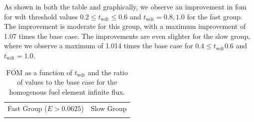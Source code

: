 As shown in both the table and graphically, we observe an improvement
in \gls{fom} for \gls{wdt} threshold values
$0.2 \leq t_{\mathrm{wdt}} \leq 0.6$ and $t_{\mathrm{wdt}} = 0.8, 1.0$ for
the fast group. The improvement is moderate for this
group, with a maximum improvement of 1.07 times the base case. The
improvements are even slighter for the slow group, where we observe a
maximum of 1.014 times the base case for $0.4 \leq t_{\mathrm{wdt}} 0.6$ and $t_{\mathrm{wdt}} = 1.0$.

\begin{table}[hbtp]
  \centering
  \caption[$\overline{\mathrm{FOM}}$ and ratio for
    the homogenous fuel element infinite flux.]{$\overline{\mathrm{FOM}}$ as a function of
    $t_{\mathrm{wdt}}$ and the ratio of values to the base case for
    the homogenous fuel element infinite flux.}
  \begin{tabular}{cc} Fast Group ($E > 0.0625$) & Slow Group \\
    
 &
   
  \end{tabular}
\label{tab:homog_inf_flx}
\end{table}
